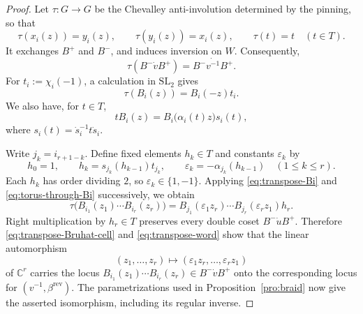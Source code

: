 \documentclass[12pt, reqno]{amsart}
\theoremstyle{plain}
\theoremstyle{definition}
\numberwithin{equation}{section}
\begin{document}
\begin{proof}
Let \(\tau:G\to G\) be the Chevalley anti-involution determined by
the pinning, so that
\[
\tau(x_i(z))=y_i(z),\qquad
\tau(y_i(z))=x_i(z),\qquad
\tau(t)=t\quad(t\in T).
\]
It exchanges \(B^+\) and \(B^-\), and induces inversion on \(W\).
Consequently,
\begin{equation}\label{eq:transpose-Bruhat-cell}
\tau(B^-\dot vB^+)=B^-\dot{v^{-1}}B^+.
\end{equation}
For \(t_i:=\chi_i(-1)\), a calculation in \(\mathrm{SL}_2\) gives
\begin{equation}\label{eq:transpose-Bi}
\tau(B_i(z))=B_i(-z)t_i.
\end{equation}
We also have, for \(t\in T\),
\begin{equation}\label{eq:torus-through-Bi}
tB_i(z)=B_i\bigl(\alpha_i(t)z\bigr)s_i(t),
\end{equation}
where \(s_i(t)=\dot s_i^{-1}t\dot s_i\).

Write \(j_k=i_{r+1-k}\). Define fixed elements \(h_k\in T\)
and constants \(\varepsilon_k\) by
\[
h_0=1,\qquad
h_k=s_{j_k}(h_{k-1})t_{j_k},\qquad
\varepsilon_k=-\alpha_{j_k}(h_{k-1})\quad(1\leq k\leq r).
\]
Each \(h_k\) has order dividing \(2\), so
\(\varepsilon_k\in\{1,-1\}\). Applying
\eqref{eq:transpose-Bi} and \eqref{eq:torus-through-Bi} successively,
we obtain
\begin{equation}\label{eq:transpose-word}
\tau\bigl(B_{i_1}(z_1)\cdots B_{i_r}(z_r)\bigr)
=
B_{j_1}(\varepsilon_1z_r)\cdots
B_{j_r}(\varepsilon_rz_1)h_r.
\end{equation}
Right multiplication by \(h_r\in T\) preserves every double coset
\(B^-\dot uB^+\). Therefore
\eqref{eq:transpose-Bruhat-cell} and \eqref{eq:transpose-word} show
that the linear automorphism
\[
(z_1,\ldots,z_r)\longmapsto
(\varepsilon_1z_r,\ldots,\varepsilon_rz_1)
\]
of \(\mathbb C^r\) carries the locus
\(B_{i_1}(z_1)\cdots B_{i_r}(z_r)\in B^-\dot vB^+\)
onto the corresponding locus for
\((v^{-1},\beta^{\operatorname{rev}})\).
The parametrizations used in Proposition~\ref{pro:braid} now give
the asserted isomorphism, including its regular inverse.
\end{proof}
\end{document}
